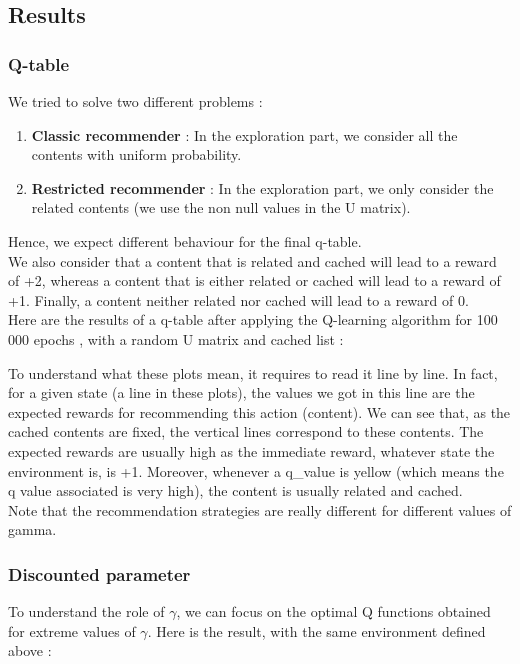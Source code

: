 \documentclass[a4paper]{article}
\begin{document}
\subsection{Results}

	\subsubsection{Q-table}
	
	We tried to solve two different problems : 
		\begin{enumerate}
			
			\item \textbf{Classic recommender} : In the exploration part, we consider all the contents with uniform probability.
			\item \textbf{Restricted recommender} : In the exploration part, we only consider the related contents (we use the non null values in the U matrix).
			
		\end{enumerate}
	Hence, we expect different behaviour for the final q-table.  \\
	We also consider that a content that is related and cached will lead to a reward of +2, whereas a content that is either related or cached will lead to a reward of +1. Finally, a content neither related nor cached will lead to a reward of 0. \\
	Here are the results of a q-table after applying the Q-learning algorithm for 100 000 epochs , with a random U matrix and cached list : 
	
	
	
	
	To understand what these plots mean, it requires to read it line by line. In fact, for a given state (a line in these plots), the values we got in this line are the expected rewards for recommending this action (content). We can see that, as the cached contents are fixed, the vertical lines correspond to these contents. The expected rewards are usually high as the immediate reward, whatever state the environment is,  is +1. Moreover, whenever a q_value is yellow (which means the q value associated is very high), the content is usually related and cached. \\
	Note that the recommendation strategies are really different for different values of gamma.
	 
	
	\subsubsection{Discounted \gamma parameter}
	To understand the role of $\gamma$, we can focus on the optimal Q functions obtained for extreme values of $\gamma$.
	Here is the result, with the same environment defined above : 
	
\end{document}
